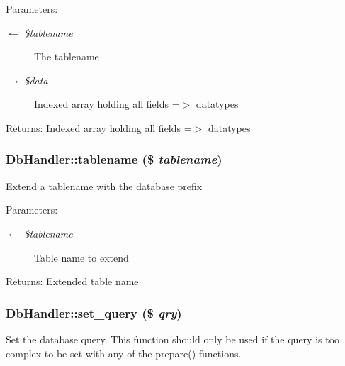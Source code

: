 \begin{Desc}
\item[Parameters:]
\begin{description}
\item[\mbox{$\leftarrow$} {\em \$tablename}]The tablename \item[\mbox{$\rightarrow$} {\em \$data}]Indexed array holding all fields =$>$ datatypes \end{description}
\end{Desc}
\begin{Desc}
\item[Returns:]Indexed array holding all fields =$>$ datatypes \end{Desc}
\hypertarget{classDbHandler_baca15a312800e5522b3efd9dff036f5}{
\subsubsection{\setlength{\rightskip}{0pt plus 5cm}DbHandler::tablename (\$ {\em tablename})}}
\label{classDbHandler_baca15a312800e5522b3efd9dff036f5}


Extend a tablename with the database prefix

\begin{Desc}
\item[Parameters:]
\begin{description}
\item[\mbox{$\leftarrow$} {\em \$tablename}]Table name to extend \end{description}
\end{Desc}
\begin{Desc}
\item[Returns:]Extended table name \end{Desc}
\hypertarget{classDbHandler_305a3225c4760a88a06b0d55d0893962}{
\subsubsection{\setlength{\rightskip}{0pt plus 5cm}DbHandler::set\_\-query (\$ {\em qry})}}
\label{classDbHandler_305a3225c4760a88a06b0d55d0893962}


Set the database query. This function should only be used if the query is too complex to be set with any of the prepare() functions.

